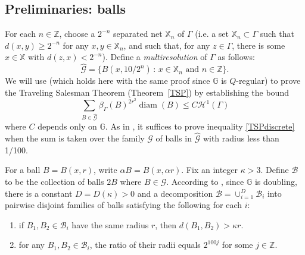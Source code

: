 \documentclass[11pt]{amsart}
\def\diam{{\rm diam\,}}
\theoremstyle{definition}
\def\diam{\operatorname{diam}}
\numberwithin{theorem}{section} \numberwithin{equation}{section}
\begin{document}
\subsection{Preliminaries: balls}

For each $n \in \mathbb{Z}$, choose a $2^{-n}$ separated net $\mathbb{X}_n$ of $\Gamma$
(i.e. a set $\mathbb{X}_n \subset \Gamma$ such that $d(x,y) \geq 2^{-n}$ for any $x,y \in \mathbb{X}_n$, 
and such that, for any $z \in \Gamma$, there is some $x \in \mathbb{X}$ with $d(z,x) < 2^{-n}$).
Define a \emph{multiresolution} of $\Gamma$ as follows:
$$
\hat{\mathcal{G}} = \{ B(x,10/2^n) \, : \, x \in \mathbb{X}_n \text{ and } n \in \mathbb{Z} \}.
$$
We will use \cite[Lemma 2.6]{LiSchul} 
(which holds here with the same proof since $\mathbb{G}$ is $Q$-regular)
to prove the Traveling Salesman Theorem (Theorem~\ref{TSP}) 
by establishing the bound
\begin{equation}
\label{TSPdiscrete}
\sum_{B \in \hat{\mathcal{G}}} \beta_{\Gamma}(B)^{2r^2} \diam(B) \leq C \mathcal{H}^1(\Gamma)
\end{equation}
where $C$ depends only on $\mathbb{G}$.
As in \cite[Lemma 2.9]{LiSchul},
it suffices to prove inequality \eqref{TSPdiscrete} 
when the sum is taken over the family $\mathcal{G}$ of balls in $\hat{\mathcal{G}}$ with radius less than 1/100. 

For a ball $B=B(x,r)$, write $\alpha B = B(x,\alpha r)$.
Fix an integer $\kappa > 3$.
Define $\mathcal{B}$ to be
the collection of balls $2B$ where $B \in \mathcal{G}$.
According to \cite[Lemma 2.11]{LiSchul},
since $\mathbb{G}$ is doubling,
there is a constant $D=D(\kappa)>0$ 
and a decomposition $\mathcal{B} = \cup_{i=1}^{D} \mathcal{B}_i$
into pairwise disjoint families of balls satisfying the following for each $i$:
\begin{enumerate}
\item if $B_1,B_2 \in \mathcal{B}_i$ have the same radius $r$, then $d(B_1,B_2) > \kappa r$. %
\item for any $B_1,B_2 \in \mathcal{B}_i$, the ratio of their radii equals $2^{100j}$ for some $j \in \mathbb{Z}$.
\end{enumerate}
\end{document}
